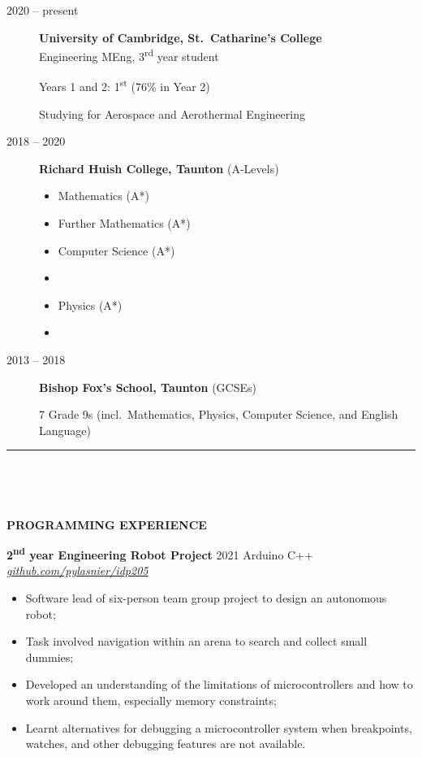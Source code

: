 \documentclass[
  11pt,
  a4paper,
]{article}
\providecommand{\tightlist}{%
  \setlength{\itemsep}{0pt}\setlength{\parskip}{0pt}}
\newcommand{\itemspace}{0.8ex}
\newcommand{\ruledheader}[2]{%
\begingroup
\setlength{\fboxsep}{0pt}%
\colorbox{#1}{%
\parbox[b][1.2ex][t]{35mm}{\begin{tiny}\ \end{tiny}}}%
\parbox[b][1.2ex][t]{5mm}{\begin{tiny}\ \end{tiny}}%
\uppercase{\textbf{#2}}
\endgroup}
\begin{document}
\begin{description}
\item[2020 -- present]
\textbf{University of Cambridge, St.~Catharine's College}\\
Engineering MEng, 3\textsuperscript{rd} year student

Years 1 and 2: 1\textsuperscript{st} (76\% in Year 2)

Studying for Aerospace and Aerothermal Engineering
\item[2018 -- 2020]
\textbf{Richard Huish College, Taunton} (A-Levels)

\begingroup
\begin{multicols}{3}

\begin{itemize}
\tightlist
\item
  Mathematics (A*)
\item
  Further Mathematics (A*)
\item
  Computer Science (A*)
\item
\item
  Physics (A*)
\item
\end{itemize}

\end{multicols}
\vspace{-\parskip}\endgroup
\item[2013 -- 2018]
\textbf{Bishop Fox's School, Taunton} (GCSEs)

7 Grade 9s (incl.~Mathematics, Physics, Computer Science, and English
Language)
\end{description}

\begin{Large}

\vspace{-1.5ex}\rule{\textwidth}{0.8pt}\vspace{2ex}

\ruledheader{cyan!50!teal}{Programming experience}\end{Large}

\vspace{\itemspace}

\textbf{2\textsuperscript{nd} year Engineering Robot Project} \textbar{}
2021 \textbar{} Arduino C++ \textbar{}
\href{https://github.com/pylasnier/idp205}{\emph{github.com/pylasnier/idp205}}

\begin{itemize}
\tightlist
\item
  Software lead of six-person team group project to design an autonomous
  robot;
\item
  Task involved navigation within an arena to search and collect small
  dummies;
\item
  Developed an understanding of the limitations of microcontrollers and
  how to work around them, especially memory constraints;
\item
  Learnt alternatives for debugging a microcontroller system when
  breakpoints, watches, and other debugging features are not available.
\end{itemize}
\end{document}
